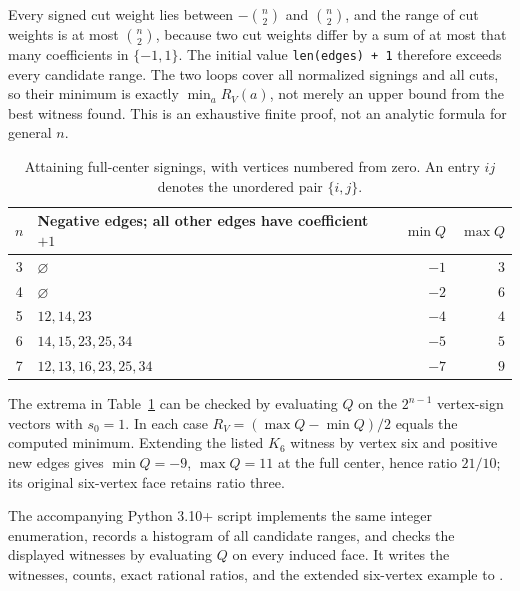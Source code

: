 Every signed cut weight lies between $-\binom n2$ and $\binom n2$,
and the range of cut weights is at most $\binom n2$, because two cut
weights differ by a sum of at most that many coefficients in $\{-1,1\}$.
The initial value \texttt{len(edges) + 1} therefore exceeds every
candidate range. The two loops cover all normalized signings and all cuts,
so their minimum is exactly $\min_a R_V(a)$, not merely an upper bound
from the best witness found. This is an exhaustive finite proof, not an
analytic formula for general $n$.

\begin{table}[htbp]
\centering
\begin{tabular}{clrr}
\toprule
$n$ & Negative edges; all other edges have coefficient $+1$
    & $\min Q$ & $\max Q$\\
\midrule
3 & $\varnothing$ & $-1$ & $3$\\
4 & $\varnothing$ & $-2$ & $6$\\
5 & $12,14,23$ & $-4$ & $4$\\
6 & $14,15,23,25,34$ & $-5$ & $5$\\
7 & $12,13,16,23,25,34$ & $-7$ & $9$\\
\bottomrule
\end{tabular}
\caption{Attaining full-center signings, with vertices numbered from zero.
An entry $ij$ denotes the unordered pair $\{i,j\}$.}
\label{tab:finite-witnesses}
\end{table}

The extrema in Table~\ref{tab:finite-witnesses} can be checked by
evaluating $Q$ on the $2^{n-1}$ vertex-sign vectors with $s_0=1$.
In each case $R_V=(\max Q-\min Q)/2$ equals the computed minimum. Extending the listed $K_6$ witness by vertex six and positive new
edges gives $\min Q=-9$, $\max Q=11$ at the full center, hence ratio
$21/10$; its original six-vertex face retains ratio three.

The accompanying Python 3.10+ script
 implements the same
integer enumeration, records a histogram of all candidate ranges, and
checks the displayed witnesses by evaluating $Q$ on every induced face.
It writes the witnesses, counts, exact rational ratios, and the extended
six-vertex example to .
